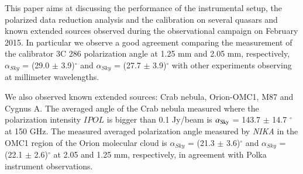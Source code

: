 \documentclass[twocolumn,traditabstract]{aa}
\begin{document}
{%

This paper aims at discussing the performance of the instrumental setup, the polarized data reduction analysis and the calibration on several quasars and known extended sources observed during the observational campaign on February 2015. 
In particular we observe a good agreement comparing the measurement of the calibrator 3C 286 polarization angle at 1.25 mm and 2.05 mm, respectively, $\alpha_{Sky}$ = (29.0 $\pm$ 3.9)$^\circ$ and $\alpha_{Sky}$ = (27.7 $\pm$ 3.9)$^\circ$ with other experiments observing at millimeter wavelengths. 


We also observed known extended sources: Crab nebula, Orion-OMC1, M87 and Cygnus A. The averaged angle of the Crab nebula  measured where the polarization intensity $IPOL$ is bigger than 0.1 Jy/beam is $\alpha_{\rm Sky}$ = 143.7 $\pm$ 14.7 $^\circ$ at 150 GHz. The measured averaged polarization angle measured by {\it NIKA} in the OMC1 region of the Orion molecular cloud is $\alpha_{Sky}$ = (21.3 $\pm$ 3.6)$^\circ$ and  $\alpha_{Sky}$ = (22.1 $\pm$ 2.6)$^\circ$ at 2.05 and 1.25 mm, respectively, in agreement with Polka instrument observations.}
	
	
\maketitle
	\tableofcontents	
\end{document}
